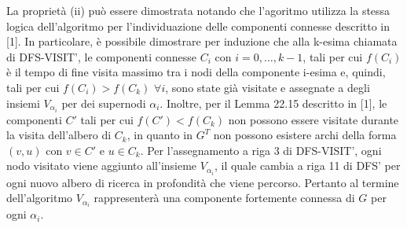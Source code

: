     La propriet\`a (ii) pu\`o essere dimostrata notando che l'agoritmo utilizza la stessa logica dell'algoritmo per
    l'individuazione delle componenti connesse descritto in [1].
    In particolare, \`e possibile dimostrare per induzione che alla k-esima chiamata di DFS-VISIT', le componenti
    connesse $C_i$ con $ i = 0,\ldots, k-1$, tali per cui $f(C_i)$ \`e il tempo di fine visita massimo tra i nodi della
    componente i-esima e, quindi, tali per cui $f(C_i) > f(C_k)$ $\forall i$, sono state gi\`a visitate e assegnate a
    degli insiemi $V_{\alpha_i}$ per dei supernodi $\alpha_i$.
    Inoltre, per il Lemma 22.15 descritto in [1], le componenti $C'$ tali per cui $f(C') < f(C_k)$ non possono essere
    visitate durante la visita dell'albero di $C_k$, in quanto in $G^T$ non possono esistere archi della forma $(v ,u)$
    con $v \in C' $ e $ u \in C_k$.
    Per l'assegnamento a riga 3 di DFS-VISIT', ogni nodo visitato viene aggiunto all'insieme $V_{\alpha_i}$, il quale cambia
    a riga 11 di DFS' per ogni nuovo albero di ricerca in profondit\`a che viene percorso.
    Pertanto al termine dell'algoritmo $V_{\alpha_i}$ rappresenter\`a una componente fortemente connessa di $G$ per ogni $\alpha_i$.